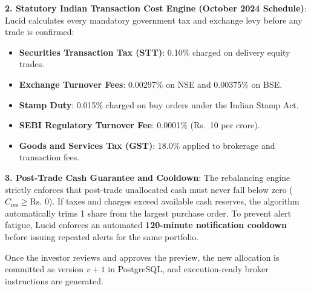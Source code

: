 \begin{table}[H]
\centering
\small
\caption{Rebalance Trade Preview: Before vs. After Allocation Realignment}
\label{tab:rebalance_preview_example}
\end{table}

\noindent \textbf{2. Statutory Indian Transaction Cost Engine (October 2024 Schedule)}:
Lucid calculates every mandatory government tax and exchange levy before any trade is confirmed:
\begin{itemize}
    \item \textbf{Securities Transaction Tax (STT)}: 0.10\% charged on delivery equity trades.
    \item \textbf{Exchange Turnover Fees}: 0.00297\% on NSE and 0.00375\% on BSE.
    \item \textbf{Stamp Duty}: 0.015\% charged on buy orders under the Indian Stamp Act.
    \item \textbf{SEBI Regulatory Turnover Fee}: 0.0001\% (Rs.~10 per crore).
    \item \textbf{Goods and Services Tax (GST)}: 18.0\% applied to brokerage and transaction fees.
\end{itemize}

\noindent \textbf{3. Post-Trade Cash Guarantee and Cooldown}:
The rebalancing engine strictly enforces that post-trade unallocated cash must never fall below zero ($C_{\text{res}} \ge \text{Rs.~}0$). If taxes and charges exceed available cash reserves, the algorithm automatically trims 1 share from the largest purchase order. To prevent alert fatigue, Lucid enforces an automated \textbf{120-minute notification cooldown} before issuing repeated alerts for the same portfolio.

Once the investor reviews and approves the preview, the new allocation is committed as version $v+1$ in PostgreSQL, and execution-ready broker instructions are generated.
